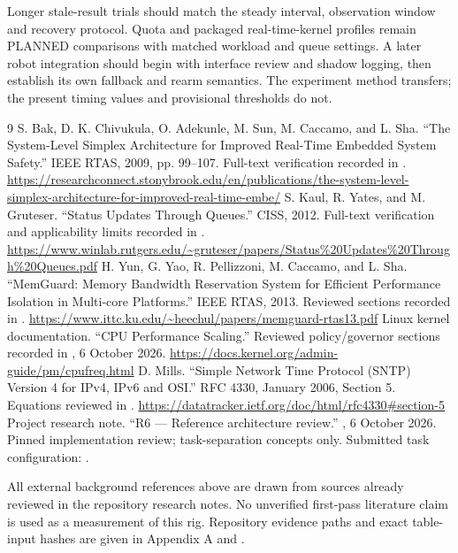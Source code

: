 \documentclass[a4paper,11pt]{article}
\newcommand{\page}{\clearpage}
\begin{document}
Longer stale-result trials should match the steady interval, observation window and recovery protocol. Quota and packaged real-time-kernel profiles remain PLANNED comparisons with matched workload and queue settings. A later robot integration should begin with interface review and shadow logging, then establish its own fallback and rearm semantics. The experiment method transfers; the present timing values and provisional thresholds do not.
\page
\begin{thebibliography}{9}
 S. Bak, D. K. Chivukula, O. Adekunle, M. Sun, M. Caccamo, and L. Sha. ``The System-Level Simplex Architecture for Improved Real-Time Embedded System Safety.'' IEEE RTAS, 2009, pp. 99--107. Full-text verification recorded in . \url{https://researchconnect.stonybrook.edu/en/publications/the-system-level-simplex-architecture-for-improved-real-time-embe/}
 S. Kaul, R. Yates, and M. Gruteser. ``Status Updates Through Queues.'' CISS, 2012. Full-text verification and applicability limits recorded in . \url{https://www.winlab.rutgers.edu/~gruteser/papers/Status%20Updates%20Through%20Queues.pdf}
 H. Yun, G. Yao, R. Pellizzoni, M. Caccamo, and L. Sha. ``MemGuard: Memory Bandwidth Reservation System for Efficient Performance Isolation in Multi-core Platforms.'' IEEE RTAS, 2013. Reviewed sections recorded in . \url{https://www.ittc.ku.edu/~heechul/papers/memguard-rtas13.pdf}
 Linux kernel documentation. ``CPU Performance Scaling.'' Reviewed policy/governor sections recorded in , 6 October 2026. \url{https://docs.kernel.org/admin-guide/pm/cpufreq.html}
 D. Mills. ``Simple Network Time Protocol (SNTP) Version 4 for IPv4, IPv6 and OSI.'' RFC 4330, January 2006, Section 5. Equations reviewed in . \url{https://datatracker.ietf.org/doc/html/rfc4330#section-5}
 Project research note. ``R6 --- Reference architecture review.'' , 6 October 2026. Pinned implementation review; task-separation concepts only. Submitted task configuration: .
\end{thebibliography}
All external background references above are drawn from sources already reviewed in the repository research notes. No unverified first-pass literature claim is used as a measurement of this rig. Repository evidence paths and exact table-input hashes are given in Appendix A and .
\end{document}
